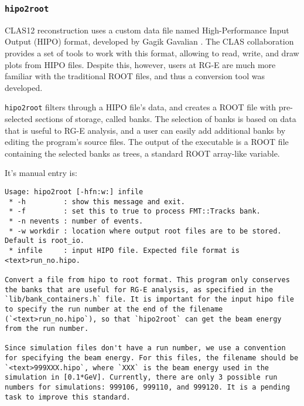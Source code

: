 \subsubsection{\texttt{hipo2root}}
    CLAS12 reconstruction uses a custom data file named High-Performance Input Output (HIPO) format, developed by Gagik Gavalian \cite{chekanov2021}.
    The CLAS collaboration provides a set of tools to work with this format, allowing to read, write, and draw plots from HIPO files.
    Despite this, however, users at RG-E are much more familiar with the traditional ROOT files, and thus a conversion tool was developed.

    \texttt{hipo2root} filters through a HIPO file's data, and creates a ROOT file with pre-selected sections of storage, called banks.
    The selection of banks is based on data that is useful to RG-E analysis, and a user can easily add additional banks by editing the program's source files.
    The output of the executable is a ROOT file containing the selected banks as trees, a standard ROOT array-like variable.

    It's manual entry is:
    \begin{lstlisting}
Usage: hipo2root [-hfn:w:] infile
 * -h         : show this message and exit.
 * -f         : set this to true to process FMT::Tracks bank.
 * -n nevents : number of events.
 * -w workdir : location where output root files are to be stored. Default is root_io.
 * infile     : input HIPO file. Expected file format is <text>run_no.hipo.

Convert a file from hipo to root format. This program only conserves the banks that are useful for RG-E analysis, as specified in the `lib/bank_containers.h` file. It is important for the input hipo file to specify the run number at the end of the filename (`<text>run_no.hipo`), so that `hipo2root` can get the beam energy from the run number.

Since simulation files don't have a run number, we use a convention for specifying the beam energy. For this files, the filename should be `<text>999XXX.hipo`, where `XXX` is the beam energy used in the simulation in [0.1*GeV]. Currently, there are only 3 possible run numbers for simulations: 999106, 999110, and 999120. It is a pending task to improve this standard.
    \end{lstlisting}
